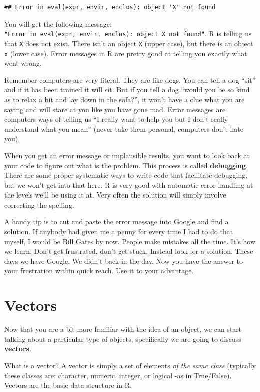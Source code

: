\documentclass[]{book}
\begin{document}
\begin{verbatim}
## Error in eval(expr, envir, enclos): object 'X' not found
\end{verbatim}

You will get the following message: \texttt{"Error\ in\ eval(expr,\ envir,\ enclos):\ object\ \textquotesingle{}X\textquotesingle{}\ not\ found"}. R is telling us that \texttt{X} does not exist. There isn't an object \texttt{X} (upper case), but there is an object \texttt{x} (lower case). Error messages in R are pretty good at telling you exactly what went wrong.

Remember computers are very literal. They are like dogs. You can tell a dog ``sit'' and if it has been trained it will sit. But if you tell a dog ``would you be so kind as to relax a bit and lay down in the sofa?'', it won't have a clue what you are saying and will stare at you like you have gone mad. Error messages are computers ways of telling us ``I really want to help you but I don't really understand what you mean'' (never take them personal, computers don't hate you).

When you get an error message or implausible results, you want to look back at your code to figure out what is the problem. This process is called \textbf{debugging}. There are some proper systematic ways to write code that facilitate debugging, but we won't get into that here. R is very good with automatic error handling at the levels we'll be using it at. Very often the solution will simply involve correcting the spelling.

A handy tip is to cut and paste the error message into Google and find a solution. If anybody had given me a penny for every time I had to do that myself, I would be Bill Gates by now. People make mistakes all the time. It's how we learn. Don't get frustrated, don't get stuck. Instead look for a solution. These days we have Google. We didn't back in the day. Now you have the answer to your frustration within quick reach. Use it to your advantage.

\hypertarget{vectors}{%
\section{Vectors}\label{vectors}}

Now that you are a bit more familiar with the idea of an object, we can start talking about a particular type of objects, specifically we are going to discuss \textbf{vectors}.

What is a vector? A vector is simply a set of elements \emph{of the same class} (typically these classes are: character, numeric, integer, or logical -as in True/False). Vectors are the basic data structure in R.
\end{document}
